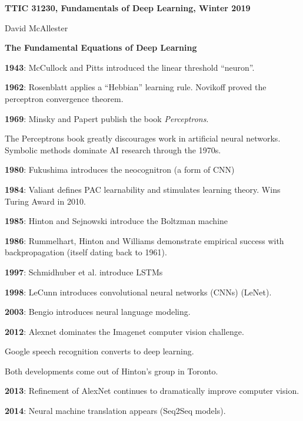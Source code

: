 




{\Huge
  \centerline{\bf TTIC 31230,  Fundamentals of Deep Learning, Winter 2019}
  \vfill
  \centerline{David McAllester}
  \vfill
  \centerline{\bf The Fundamental Equations of Deep Learning}



{\bf 1943}: McCullock and Pitts introduced the linear threshold ``neuron''.

\vfill
{\bf 1962}: Rosenblatt applies a ``Hebbian'' learning rule.  Novikoff proved the perceptron convergence theorem.

\vfill
{\bf 1969}: Minsky and Papert publish the book {\it Perceptrons}.

\vfill
The Perceptrons book greatly discourages work in artificial neural networks.  Symbolic methods dominate AI research through the 1970s.


{\bf 1980}: Fukushima introduces the neocognitron (a form of CNN)

\vfill
{\bf 1984}: Valiant defines PAC learnability and stimulates learning theory. Wins Turing Award in 2010.

\vfill
{\bf 1985}: Hinton and Sejnowski introduce the Boltzman machine

\vfill
{\bf 1986}: Rummelhart, Hinton and Williams demonstrate empirical success with backpropagation (itself dating back to 1961).


{\bf 1997}: Schmidhuber et al. introduce LSTMs

\vfill
{\bf 1998}: LeCunn introduces convolutional neural networks (CNNs) (LeNet).

\vfill
{\bf 2003}: Bengio introduces neural language modeling.


{\bf 2012}: Alexnet dominates the Imagenet computer vision challenge.

\vfill
Google speech recognition converts to deep learning.

\vfill
Both developments come out of Hinton's group in Toronto.

\vfill
{\bf 2013}: Refinement of AlexNet continues to dramatically improve computer vision.

\vfill
{\bf 2014}: Neural machine translation appears (Seq2Seq models).

}
